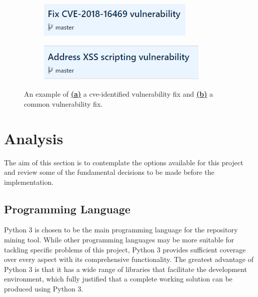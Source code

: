 \documentclass[12pt, a4paper]{report}
\begin{document}
\begin{figure}[H]
  \centering
  \begin{subfigure}{.5\textwidth}
    \centering
    \includegraphics[width=.85\linewidth]{images/cve_vuln.png}
  \end{subfigure}%
  \begin{subfigure}{.5\textwidth}
    \centering
    \includegraphics[width=.85\linewidth]{images/common_vuln.png}
  \end{subfigure}
  \caption[Comparison of a \acrshort{cve}-identified and common vulnerability-fixing commit]%
  {An example of \hyperref[figure:cve_vuln]{\textbf{(a)}} a \acrshort{cve}-identified vulnerability
  fix and \hyperref[figure:common_vuln]{\textbf{(b)}} a common vulnerability fix.}
  \label{figure:fig_scope}
\end{figure}

\section{Analysis}
The aim of this section is to contemplate the options available for this project and review some of
the fundamental decisions to be made before the implementation.

\subsection{Programming Language}
Python 3 \cite{python} is chosen to be the main programming language for the repository mining tool.
While other programming languages may be more suitable for tackling specific problems of this
project, Python 3 provides sufficient coverage over every aspect with its comprehensive
functionality. The greatest advantage of Python 3 is that it has a wide range of libraries that
facilitate the development environment, which fully justified that a complete working solution can
be produced using Python 3.
\end{document}
